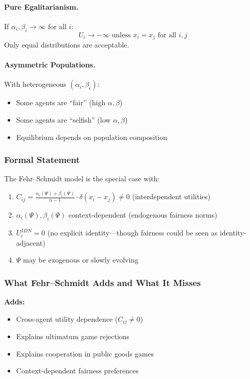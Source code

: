 \paragraph{Pure Egalitarianism.}
If $\alpha_i, \beta_i \to \infty$ for all $i$:
\begin{equation}
  U_i \to -\infty \text{ unless } x_i = x_j \text{ for all } i,j
\end{equation}
Only equal distributions are acceptable.

\paragraph{Asymmetric Populations.}
With heterogeneous $(\alpha_i, \beta_i)$:
\begin{itemize}
  \item Some agents are ``fair'' (high $\alpha, \beta$)
  \item Some agents are ``selfish'' (low $\alpha, \beta$)
  \item Equilibrium depends on population composition
\end{itemize}

\subsubsection{Formal Statement}

\begin{proposition}
The Fehr--Schmidt model is the special case with:
\begin{enumerate}
  \item $C_{ij} = \frac{\alpha_i(\Psi) + \beta_i(\Psi)}{n-1} \cdot \delta(x_i - x_j) \neq 0$ 
        (interdependent utilities)
  \item $\alpha_i(\Psi), \beta_i(\Psi)$ context-dependent (endogenous fairness norms)
  \item $U_i^{IDN} = 0$ (no explicit identity---though fairness could be seen as identity-adjacent)
  \item $\Psi$ may be exogenous or slowly evolving
\end{enumerate}
\end{proposition}

\subsubsection{What Fehr--Schmidt Adds and What It Misses}

\textbf{Adds:}
\begin{itemize}
  \item Cross-agent utility dependence ($C_{ij} \neq 0$)
  \item Explains ultimatum game rejections
  \item Explains cooperation in public goods games
  \item Context-dependent fairness preferences
\end{itemize}


